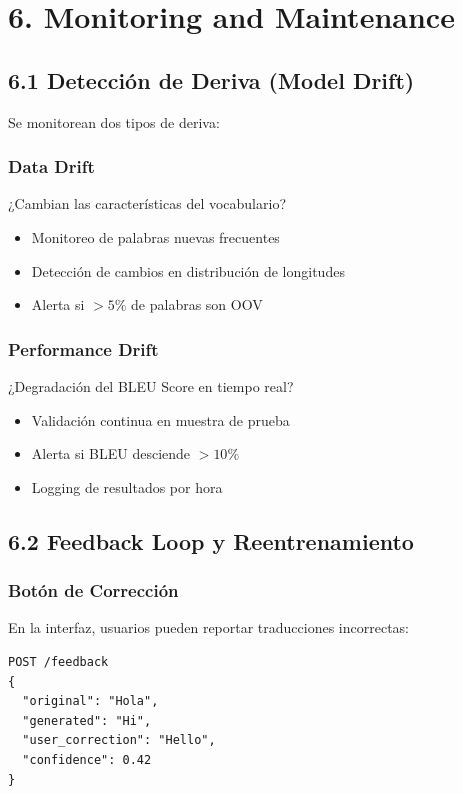 \documentclass[12pt,a4paper]{article}
\begin{document}
\section{6. Monitoring and Maintenance}

\subsection{6.1 Detección de Deriva (Model Drift)}

Se monitorean dos tipos de deriva:

\subsubsection{Data Drift}
¿Cambian las características del vocabulario?
\begin{itemize}
    \item Monitoreo de palabras nuevas frecuentes
    \item Detección de cambios en distribución de longitudes
    \item Alerta si $> 5\%$ de palabras son OOV
\end{itemize}

\subsubsection{Performance Drift}
¿Degradación del BLEU Score en tiempo real?
\begin{itemize}
    \item Validación continua en muestra de prueba
    \item Alerta si BLEU desciende $> 10\%$
    \item Logging de resultados por hora
\end{itemize}

\subsection{6.2 Feedback Loop y Reentrenamiento}

\subsubsection{Botón de Corrección}
En la interfaz, usuarios pueden reportar traducciones incorrectas:
\begin{lstlisting}
POST /feedback
{
  "original": "Hola",
  "generated": "Hi",
  "user_correction": "Hello",
  "confidence": 0.42
}
\end{lstlisting}
\end{document}
